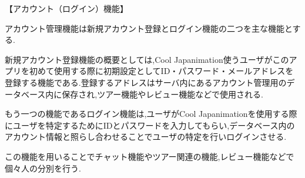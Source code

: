 【アカウント（ログイン）機能】
\par アカウント管理機能は新規アカウント登録とログイン機能の二つを主な機能とする.
\par 新規アカウント登録機能の概要としては,Cool Japanimation使うユーザがこのアプリを初めて使用する際に初期設定としてID・パスワード・メールアドレスを登録する機能である.登録するアドレスはサーバ内にあるアカウント管理用のデータベース内に保存され,ツアー機能やレビュー機能などで使用される.
\par もう一つの機能であるログイン機能は,ユーザがCool Japanimationを使用する際にユーザを特定するためにIDとパスワードを入力してもらい,データベース内のアカウント情報と照らし合わせることでユーザの特定を行いログインさせる.
\par この機能を用いることでチャット機能やツアー関連の機能,レビュー機能などで個々人の分別を行う.
